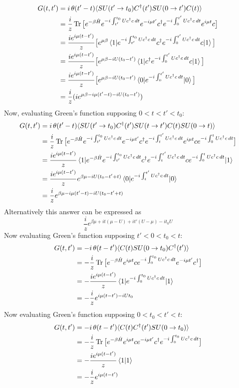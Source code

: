 \documentclass{article}
\begin{document}
\begin{align*}
G(t,t') &= i\operatorname{\theta}(t' - t) \langle SU( t' \rightarrow t_0)C^\dagger(t')SU(0\rightarrow t')C(t) \rangle \\
&= \frac{i}{z}\operatorname{Tr}\big[e^{-\beta\hat{H}} e^{-i\int_{t'}^{t_0}U c^\dagger c\, dt} e^{-i\mu t'} c^\dagger e^{-i\int_0^{t'} Uc^\dagger c\, dt} e^{i\mu t} c \big] \\
&= \frac{ie^{i\mu(t-t')}}{z}\big[e^{\mu\beta} \braket{1| e^{-i\int_{t'}^{t_0}U c^\dagger c\,dt} c^\dagger e^{-i\int_0^{t'}Uc^\dagger c\, dt} c|1} \big] \\
&= \frac{ie^{i\mu(t-t')}}{z}\big[e^{\mu\beta - iU(t_0 - t')}\braket{1|c^\dagger e^{-i\int_0^{t'}Uc^\dagger c\, dt} c|1}\big]\\
&= \frac{ie^{i\mu(t-t')}}{z}\big[e^{\mu\beta - iU(t_0-t')}\braket{0 |e^{-i\int_0^{t'}Uc^\dagger c\, dt} |0} \big] \\
&= \frac{i}{z}(ie^{\mu\beta - i\mu(t'-t) - iU(t_0-t')})
\end{align*}
Now, evaluating Green's function supposing $0 < t < t' < t_0$:
\begin{align*}
G(t,t') &= i\operatorname{\theta}(t'-t)\langle SU(t'\rightarrow t_0)C^\dagger(t')SU(t\rightarrow t')C(t)SU(0\rightarrow t) \rangle \\
&= \frac{i}{z}\operatorname{Tr}\big[e^{-\beta\hat{H}}e^{-i\int_{t'}^{t_0}Uc^\dagger c\,dt}e^{-i\mu t'}c^\dagger e^{-i\int_{t}^{t'}Uc^\dagger c\,dt} e^{i\mu t}ce^{-i\int_0^tUc^\dagger c\, dt}\big] \\
&= \frac{ie^{i\mu(t-t')}}{z}\braket{1|e^{-\beta\hat{H}}e^{-i\int_{t'}^{t_0}Uc^\dagger c\,dt}c^\dagger e^{-i\int_{t}^{t'}Uc^\dagger c\,dt}ce^{-i\int_0^tUc^\dagger c\, dt}|1} \\
&= \frac{ie^{i\mu(t-t')}}{z}e^{\beta\mu - iU(t_0-t'+t)}\braket{0|e^{-i\int_t^{t'}Uc^\dagger c\,dt}|0} \\
&= \frac{i}{z}e^{\beta\mu -i\mu(t'-t) - iU(t_0 - t' + t)} 
\end{align*}
Alternatively this answer can be expressed as 
\begin{equation*} \frac{i}{z}e^{\beta\mu +it(\mu-U) +it'(U-\mu) -it_0U} \end{equation*}
Now evaluating Green's function supposing $t' < 0 < t_0 < t$:
\begin{align*}
G(t, t') &= -i\operatorname{\theta}(t-t')\langle C(t)SU(0\rightarrow t_0)C^\dagger(t') \rangle \\
&= -\frac{i}{z} \operatorname{Tr}\big[e^{-\beta\hat{H}}e^{i\mu t}ce^{-i\int_0^{t_0}Uc^\dagger c\,dt}e^{-i\mu t'}c^\dagger\big] \\
&= -\frac{ie^{i\mu(t-t')}}{z}\braket{1|e^{-i\int_0^{t_0}Uc^\dagger c\,dt}|1} \\
&= -\frac{i}{z} e^{i\mu(t-t') - iUt_0}
\end{align*}
Now evaluating Green's function supposing $0 < t_0 < t' < t$:
\begin{align*}
G(t,t') &= -i\operatorname{\theta}(t-t')\langle C(t)C^\dagger(t')SU(0\rightarrow t_0) \rangle \\
&= -\frac{i}{z}\operatorname{Tr}\big[e^{-\beta\hat{H}}e^{i\mu t} c e^{-i\mu t'} c^\dagger e^{-i\int_0^{t_0} Uc^\dagger c\,dt}\big] \\
&= -\frac{ie^{i\mu(t-t')}}{z}\braket{1|1} \\
&= -\frac{i}{z}e^{i\mu(t-t')}
\end{align*}
\end{document}
